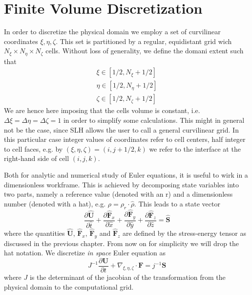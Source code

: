 \section{Finite Volume Discretization}
In order to discretize the physical domain we employ a set of curvilinear coordinates $\xi, \eta, \zeta$. This set is partitioned by a regular, equidistant grid wich $N_{\xi} \times N_{\eta} \times N_{\zeta}$ cells. Without loss of generality, we define the domani extent such that
\begin{equation}
\begin{split}
\xi \in [1/2, N_{\xi} + 1/2] \\
\eta \in [1/2, N_{\eta} + 1/2] \\
\zeta \in [1/2, N_{\zeta} + 1/2] 
\end{split}
\end{equation}
We are hence here imposing that the cells volume is constant, i.e. $\Delta \xi = \Delta \eta = \Delta \zeta = 1$ in order to simplify some calculations. This might in general not be the case, since SLH allows the user to call a general curvilinear grid. In this particular case integer values of coordinates refer to cell centers, half integer to cell faces, e.g. by $(\xi, \eta, \zeta) = (i, j + 1/2, k)$ we refer to the interface at the right-hand side of cell $(i, j, k)$.

Both for analytic and numerical study of Euler equations, it is useful to wirk in a dimensionless workframe. This is achieved by decomposing state variables into two parts, namely a reference value (denoted with an r) and a dimensionless number (denoted with a hat), e.g. $\rho = \rho_r \cdot \hat{\rho}$. This leads to a state vector 
\begin{equation}
\frac{\partial \mathbf{\hat{U}}}{\partial \hat{t}} + \frac{\partial \mathbf{\hat{F}}_x}{\partial \hat{x}} + \frac{\partial \mathbf{\hat{F}}_y}{\partial \hat{y}} + \frac{\partial \mathbf{\hat{F}}_z}{\partial \hat{z}} = \mathbf{\hat{S}}
\end{equation}
where the quantities $\mathbf{\hat{U}}$, $\mathbf{\hat{F}}_x$, $\mathbf{\hat{F}}_y$ and $\mathbf{\hat{F}}_z$ are defined by the stress-energy tensor as discussed in the previous chapter. From now on for simplicity we will drop the hat notation. We discretize \textit{in space} Euler equation as 
\begin{equation}
J^{-1}\frac{\partial \mathbf{U}}{\partial t} + \nabla_{\xi, \eta, \zeta} \cdot \mathbf{F} = j^{-1} \mathbf{S}
\end{equation}
where $J$ is the determinant of the jacobian of the transformation from the physical domain to the computational grid.

